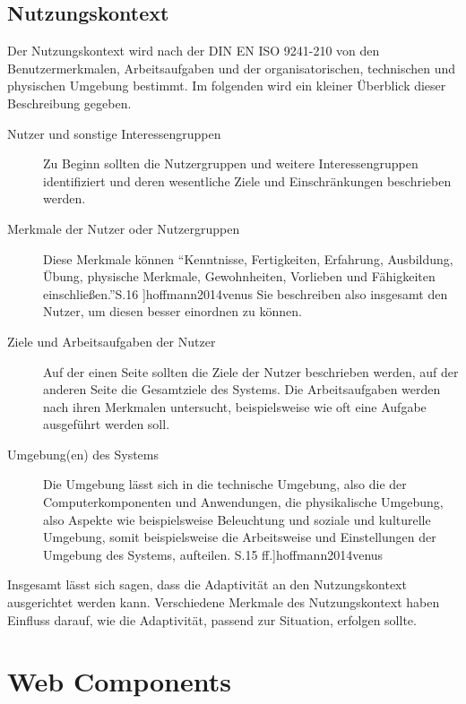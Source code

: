\documentclass[12pt, paper=a4, bibtotoc, toc=listof, headsepline=true]{scrreprt}
\renewcommand{\smfootcite}[2][2]{\relax}
\begin{document}
		\section{Nutzungskontext}
		Der Nutzungskontext wird nach der DIN EN ISO 9241-210 von den Benutzermerkmalen, Arbeitsaufgaben und der organisatorischen, technischen und physischen Umgebung bestimmt. Im folgenden wird ein kleiner Überblick dieser  Beschreibung gegeben.
		\begin{description}  
			\item  [Nutzer und sonstige Interessengruppen] 
			Zu Beginn sollten die Nutzergruppen und weitere Interessengruppen identifiziert und deren wesentliche Ziele und Einschränkungen beschrieben werden.
			
			\item [Merkmale der Nutzer oder Nutzergruppen]
			Diese Merkmale können \enquote{Kenntnisse, Fertigkeiten, Erfahrung, Ausbildung, Übung, physische Merkmale, Gewohnheiten, Vorlieben und Fähigkeiten einschließen.}\smfootcite[][S.16 ]{hoffmann2014venus} Sie beschreiben also insgesamt den Nutzer, um diesen besser einordnen zu können.
			
			\item  [Ziele und Arbeitsaufgaben der Nutzer]
			Auf der einen Seite sollten die Ziele der Nutzer beschrieben werden, auf der anderen Seite die Gesamtziele des Systems. Die Arbeitsaufgaben werden nach ihren Merkmalen untersucht, beispielsweise wie oft eine Aufgabe ausgeführt werden soll.
			
			\item [Umgebung(en) des Systems]
			Die Umgebung lässt sich in die technische Umgebung, also die der Computerkomponenten und Anwendungen, die physikalische Umgebung, also Aspekte wie beispielsweise Beleuchtung und soziale und kulturelle Umgebung, somit beispielsweise die Arbeitsweise und Einstellungen der Umgebung des Systems, aufteilen.
			\smfootcite[ vgl.][S.15 ff.]{hoffmann2014venus}
			
		\end{description}
		Insgesamt lässt sich sagen, dass die Adaptivität an den Nutzungskontext ausgerichtet werden kann. Verschiedene Merkmale des Nutzungskontext haben Einfluss darauf, wie die Adaptivität, passend zur Situation, erfolgen sollte.
	
			
			
		
	\chapter{Web Components}
\end{document}
